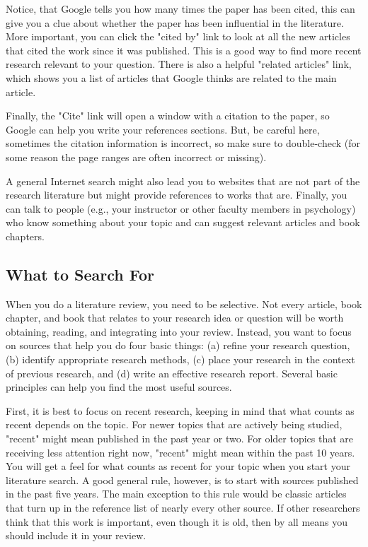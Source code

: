 Notice, that Google tells you how many times the paper has been cited, this can give you a clue about whether the paper has been influential in the literature. More important, you can click the "cited by" link to look at all the new articles that cited the work since it was published. This is a good way to find more recent research relevant to your question. There is also a helpful "related articles" link, which shows you a list of articles that Google thinks are related to the main article.

Finally, the "Cite" link will open a window with a citation to the paper, so Google can help you write your references sections. But, be careful here, sometimes the citation information is incorrect, so make sure to double-check (for some reason the page ranges are often incorrect or missing).

 A general Internet search might also lead you to websites that are not part of the research literature but might provide references to works that are. Finally, you can talk to people (e.g., your instructor or other faculty members in psychology) who know something about your topic and can suggest relevant articles and book chapters.

\subsection{What to Search For}
When you do a literature review, you need to be selective. Not every article, book chapter, and book that relates to your research idea or question will be worth obtaining, reading, and integrating into your review. Instead, you want to focus on sources that help you do four basic things: (a) refine your research question, (b) identify appropriate research methods, (c) place your research in the context of previous research, and (d) write an effective research report. Several basic principles can help you find the most useful sources.

First, it is best to focus on recent research, keeping in mind that what counts as recent depends on the topic. For newer topics that are actively being studied, "recent" might mean published in the past year or two. For older topics that are receiving less attention right now, "recent" might mean within the past 10 years. You will get a feel for what counts as recent for your topic when you start your literature search. A good general rule, however, is to start with sources published in the past five years. The main exception to this rule would be classic articles that turn up in the reference list of nearly every other source. If other researchers think that this work is important, even though it is old, then by all means you should include it in your review.

